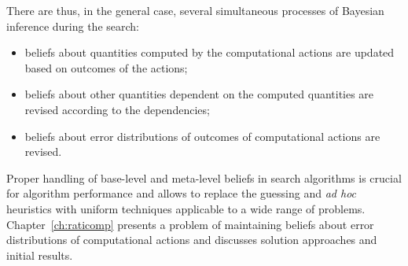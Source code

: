 There are thus, in the general case, several simultaneous processes of
Bayesian inference during the search:
\begin{itemize}
\item beliefs about quantities computed by the computational actions
are updated based on outcomes of the actions;
\item beliefs about other quantities dependent on the computed
quantities are revised according to the dependencies;
\item beliefs about error distributions of  outcomes of computational
actions are revised.
\end{itemize}
Proper handling of base-level and meta-level beliefs in search
algorithms is crucial for algorithm performance and allows to replace
the guessing and {\it ad hoc} heuristics with uniform techniques
applicable to a wide range of
problems. Chapter~\ref{ch:raticomp} presents a
problem of maintaining beliefs about error distributions of
computational actions and discusses solution approaches and initial
results.

